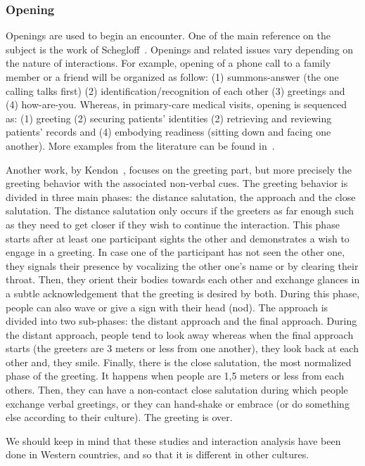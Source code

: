 \documentclass[a4paper,11pt,twoside]{StyleThese}
\begin{document}
\subsubsection{Opening}
Openings are used to begin an encounter. One of the main reference on the subject is the work of Schegloff~\cite{schegloff_1986_routine}. Openings and related issues vary depending on the nature of interactions. For example, opening of a phone call to a family member or a friend will be organized as follow: (1) summons-answer (the one calling talks first) (2) identification/recognition of each other (3) greetings and (4) how-are-you. Whereas, in primary-care medical visits, opening is sequenced as: (1) greeting (2) securing patients’ identities (2) retrieving and reviewing patients’ records and (4) embodying readiness (sitting down and facing one another). More examples from the literature can be found in~\cite{robinson_overall_2012}. 

Another work, by Kendon~\cite{kendon_1990_conducting}, focuses on the greeting part, but more precisely the greeting behavior with the associated non-verbal cues. The greeting behavior is divided in three main phases: the distance salutation, the approach and the close salutation. 
The distance salutation only occurs if the greeters as far enough such as they need to get closer if they wish to continue the interaction. This phase starts after at least one participant sights the other and demonstrates a wish to engage in a greeting. In case one of the participant has not seen the other one, they signals their presence by vocalizing the other one’s name or by clearing their throat. Then, they orient their bodies towards each other and exchange glances in a subtle acknowledgement that the greeting is desired by both. During this phase, people can also wave or give a sign with their head (\eg nod).
The approach is divided into two sub-phases: the distant approach and the final approach. During the distant approach, people tend to look away whereas when the final approach starts (the greeters are 3 meters or less from one another), they look back at each other and, they smile.
Finally, there is the close salutation, the most normalized phase of the greeting. It happens when people are 1,5 meters or less from each others. Then, they can have a non-contact close salutation during which people exchange verbal greetings, or they can hand-shake or embrace (or do something else according to their culture). The greeting is over.

We should keep in mind that these studies and interaction analysis have been done in Western countries, and so that it is different in other cultures.
\end{document}
